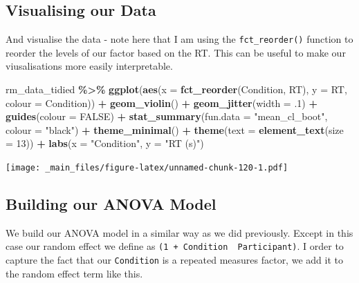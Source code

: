 \documentclass[
]{book}
\newenvironment{Shaded}{\begin{snugshade}}{\end{snugshade}}
\newcommand{\AttributeTok}[1]{\textcolor[rgb]{0.13,0.29,0.53}{#1}}
\newcommand{\ConstantTok}[1]{\textcolor[rgb]{0.56,0.35,0.01}{#1}}
\newcommand{\DecValTok}[1]{\textcolor[rgb]{0.00,0.00,0.81}{#1}}
\newcommand{\FunctionTok}[1]{\textcolor[rgb]{0.13,0.29,0.53}{\textbf{#1}}}
\newcommand{\NormalTok}[1]{#1}
\newcommand{\SpecialCharTok}[1]{\textcolor[rgb]{0.81,0.36,0.00}{\textbf{#1}}}
\newcommand{\StringTok}[1]{\textcolor[rgb]{0.31,0.60,0.02}{#1}}
\begin{document}
\hypertarget{visualising-our-data-1}{%
\subsection{Visualising our Data}\label{visualising-our-data-1}}

And visualise the data - note here that I am using the \texttt{fct\_reorder()} function to reorder the levels of our factor based on the RT. This can be useful to make our viusalisations more easily interpretable.

\begin{Shaded}
\begin{Highlighting}[]
\NormalTok{rm\_data\_tidied }\SpecialCharTok{\%\textgreater{}\%}
  \FunctionTok{ggplot}\NormalTok{(}\FunctionTok{aes}\NormalTok{(}\AttributeTok{x =} \FunctionTok{fct\_reorder}\NormalTok{(Condition, RT), }\AttributeTok{y =}\NormalTok{ RT, }\AttributeTok{colour =}\NormalTok{ Condition)) }\SpecialCharTok{+}
  \FunctionTok{geom\_violin}\NormalTok{() }\SpecialCharTok{+}
  \FunctionTok{geom\_jitter}\NormalTok{(}\AttributeTok{width =}\NormalTok{ .}\DecValTok{1}\NormalTok{) }\SpecialCharTok{+}
  \FunctionTok{guides}\NormalTok{(}\AttributeTok{colour =} \ConstantTok{FALSE}\NormalTok{) }\SpecialCharTok{+}
  \FunctionTok{stat\_summary}\NormalTok{(}\AttributeTok{fun.data =} \StringTok{"mean\_cl\_boot"}\NormalTok{, }\AttributeTok{colour =} \StringTok{"black"}\NormalTok{) }\SpecialCharTok{+}
  \FunctionTok{theme\_minimal}\NormalTok{() }\SpecialCharTok{+}
  \FunctionTok{theme}\NormalTok{(}\AttributeTok{text =} \FunctionTok{element\_text}\NormalTok{(}\AttributeTok{size =} \DecValTok{13}\NormalTok{)) }\SpecialCharTok{+}
  \FunctionTok{labs}\NormalTok{(}\AttributeTok{x =} \StringTok{"Condition"}\NormalTok{, }\AttributeTok{y =} \StringTok{"RT (s)"}\NormalTok{)}
\end{Highlighting}
\end{Shaded}

\texttt{[image: \_main\_files/figure-latex/unnamed-chunk-120-1.pdf]}

\hypertarget{building-our-anova-model-1}{%
\subsection{Building our ANOVA Model}\label{building-our-anova-model-1}}

We build our ANOVA model in a similar way as we did previously. Except in this case our random effect we define as \texttt{(1\ +\ Condition\ \textbar{}\ Participant)}. I order to capture the fact that our \texttt{Condition} is a repeated measures factor, we add it to the random effect term like this.
\end{document}
